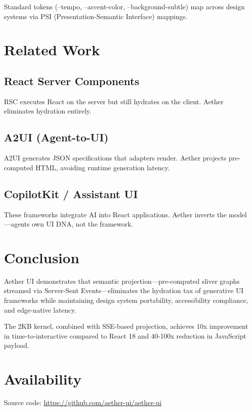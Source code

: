\documentclass[11pt]{article}
\begin{document}
Standard tokens (--tempo, --accent-color, --background-subtle) map across design systems via PSI (Presentation-Semantic Interface) mappings.

\section{Related Work}

\subsection{React Server Components}
RSC executes React on the server but still hydrates on the client. Aether eliminates hydration entirely.

\subsection{A2UI (Agent-to-UI)}
A2UI generates JSON specifications that adapters render. Aether projects pre-computed HTML, avoiding runtime generation latency.

\subsection{CopilotKit / Assistant UI}
These frameworks integrate AI into React applications. Aether inverts the model—agents own UI DNA, not the framework.

\section{Conclusion}

Aether UI demonstrates that semantic projection—pre-computed sliver graphs streamed via Server-Sent Events—eliminates the hydration tax of generative UI frameworks while maintaining design system portability, accessibility compliance, and edge-native latency.

The 2KB kernel, combined with SSE-based projection, achieves 10x improvement in time-to-interactive compared to React 18 and 40-100x reduction in JavaScript payload.

\section*{Availability}

Source code: \url{https://github.com/aether-ui/aether-ui}



\end{document}
